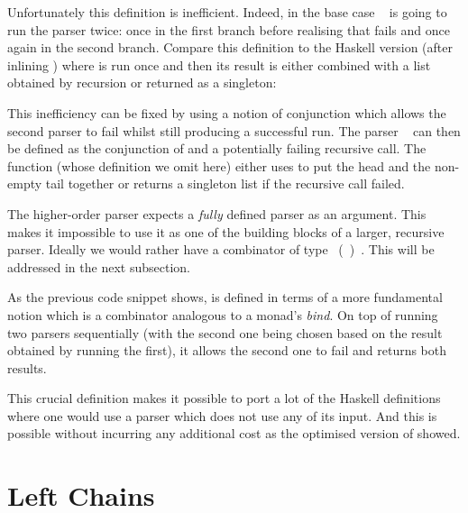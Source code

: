 
 Unfortunately this definition is inefficient.
Indeed, in the base case \mbox{ } is going to run the parser
 twice: once in the first branch before realising that 
fails and once again in the second branch. Compare this definition to
the Haskell version (after inlining ) where  is run once
and then its result is either combined with a list obtained by recursion
or returned as a singleton:


This inefficiency can be fixed by using a notion of conjunction
 which allows the second parser to fail whilst still
producing a successful run. The parser \mbox{ } can then be
defined as the conjunction of  and a potentially failing
recursive call. The function  (whose definition we omit here)
either uses \AF{$\_::^{+}\_$} to put the head and the non-empty
tail together or returns a singleton list if the recursive call
failed.


\label{parser:some} The higher-order parser 
expects a \emph{fully} defined parser as an argument. This makes
it impossible to use it as one of the building blocks of a larger,
recursive parser. Ideally we would rather have a combinator of
type \mbox{\AF{[}     ( ) \AF{]}}.
This will be addressed in the next subsection.
\medskip{}

As the previous code snippet shows,  is defined in
terms of a more fundamental notion  which is a
combinator analogous to a monad's \textit{bind}. On top of running
two parsers sequentially (with the second one being chosen based on
the result obtained by running the first), it allows the second one to fail
and returns both results.


This crucial definition makes it possible to port a lot of the Haskell
definitions where one would use a parser which does not use any of its
input. And this is possible without incurring any additional cost as
the optimised version of  showed.

\section{Left Chains}

